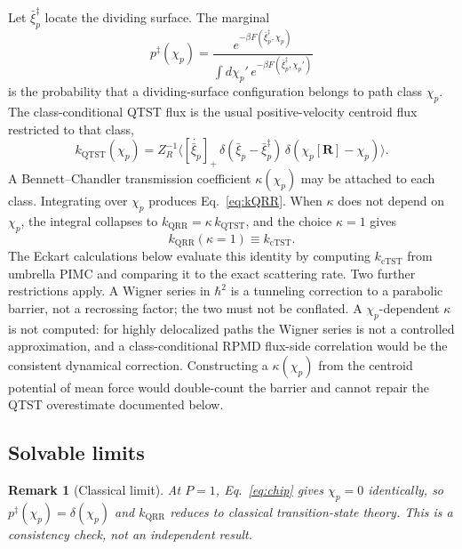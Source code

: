 \documentclass[%
 aip,
 jcp,
 amsmath,amssymb,
 reprint,
 floatfix,
]{revtex4-2}
\newtheorem{remark}{Remark}
\newcommand{\xip}{\bar{\xi}_p}
\newcommand{\chip}{\chi_p}
\newcommand{\kQRR}{k_{\mathrm{QRR}}}
\newcommand{\kQTST}{k_{\mathrm{QTST}}}
\newcommand{\kcTST}{k_{\mathrm{cTST}}}
\begin{document}
Let $\xip^\ddagger$ locate the dividing surface. The marginal
\begin{equation}
  p^\ddagger(\chip)
  =
  \frac
  {e^{-\beta F(\xip^\ddagger,\chip)}}
  {\displaystyle\int d\chip'\,e^{-\beta F(\xip^\ddagger,\chip')}}
\end{equation}
is the probability that a dividing-surface configuration belongs to path class $\chip$. The class-conditional QTST flux is the usual positive-velocity centroid flux restricted to that class,
\begin{equation}
  \kQTST(\chip)
  =
  Z_R^{-1}
  \bigl\langle
    [\dot{\xip}]_+\,
    \delta(\xip-\xip^\ddagger)\,
    \delta(\chip[\mathbf{R}]-\chip)
  \bigr\rangle.
\end{equation}
A Bennett--Chandler transmission coefficient $\kappa(\chip)$ may be attached to each class.\cite{bennett1977,chandler1978,craig2005} Integrating over $\chip$ produces Eq.~\eqref{eq:kQRR}. When $\kappa$ does not depend on $\chip$, the integral collapses to $\kQRR=\kappa\,\kQTST$, and the choice $\kappa=1$ gives
\begin{equation}
  \kQRR(\kappa=1)\equiv\kcTST.
  \label{eq:identity}
\end{equation}
The Eckart calculations below evaluate this identity by computing $\kcTST$ from umbrella PIMC and comparing it to the exact scattering rate. Two further restrictions apply. A Wigner series in $\hbar^2$ is a tunneling correction to a parabolic barrier,\cite{wigner1932,wigner1938} not a recrossing factor; the two must not be conflated. A $\chip$-dependent $\kappa$ is not computed: for highly delocalized paths the Wigner series is not a controlled approximation, and a class-conditional RPMD flux-side correlation would be the consistent dynamical correction.\cite{craig2005} Constructing a $\kappa(\chip)$ from the centroid potential of mean force would double-count the barrier and cannot repair the QTST overestimate documented below.

\subsection{Solvable limits}

\begin{remark}[Classical limit]
\label{rem:classical}
At $P=1$, Eq.~\eqref{eq:chip} gives $\chip=0$ identically, so $p^\ddagger(\chip)=\delta(\chip)$ and $\kQRR$ reduces to classical transition-state theory. This is a consistency check, not an independent result.
\end{remark}
\end{document}
